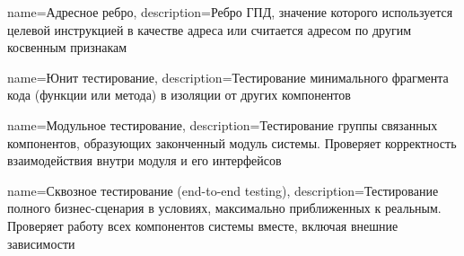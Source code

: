 {
    name={Адресное ребро},
    description={Ребро ГПД, значение которого используется целевой инструкцией в качестве адреса или считается адресом по другим косвенным признакам}
}


{
    name={Юнит тестирование},
    description={Тестирование минимального фрагмента кода (функции или метода) в изоляции от других компонентов}
}

{
    name={Модульное тестирование},
    description={Тестирование группы связанных компонентов, образующих законченный модуль системы. Проверяет корректность взаимодействия внутри модуля и его интерфейсов}
}

{
    name={Сквозное тестирование (end-to-end testing)},
    description={Тестирование полного бизнес-сценария в условиях, максимально приближенных к реальным. Проверяет работу всех компонентов системы вместе, включая внешние зависимости}
}



\makeglossaries
